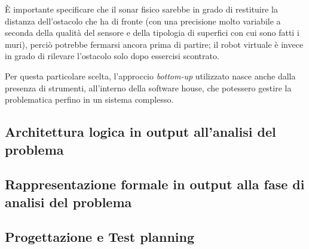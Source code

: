 È importante specificare che il sonar fisico sarebbe in grado di restituire la distanza dell'ostacolo che ha di fronte
(con una precisione molto variabile a seconda della qualità del sensore e della tipologia di superfici con cui sono fatti i muri),
perciò potrebbe fermarsi ancora prima di partire;
il robot virtuale è invece in grado di rilevare l'ostacolo solo dopo essercisi scontrato.

Per questa particolare scelta, l'approccio \textit{bottom-up} utilizzato nasce anche dalla presenza di strumenti, all'interno della software house, che potessero gestire la problematica perfino in un sistema complesso.

\subsection{Architettura logica in output all'analisi del problema}



\subsection[Rappresentazione formale]{Rappresentazione formale in output alla fase di analisi del problema}

\subsection{Progettazione e Test planning}
